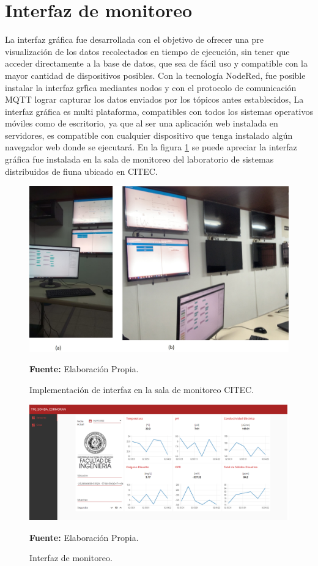 \section{Interfaz de monitoreo}
La interfaz gr\'afica fue desarrollada con el objetivo de ofrecer una pre visualizaci\'on de los datos recolectados en tiempo de ejecuci\'on, sin tener que acceder directamente a la base de datos, que sea de f\'acil uso y compatible con la mayor cantidad de dispositivos posibles.
Con la tecnolog\'ia NodeRed, fue posible instalar la interfaz gr\'fica mediantes nodos y con el protocolo de comunicaci\'on  MQTT lograr capturar los datos enviados por los t\'opicos antes  establecidos, 
La interfaz gr\'afica es multi plataforma, compatibles con todos los sistemas operativos m\'oviles como de escritorio, ya que al ser una aplicaci\'on web instalada en servidores, es compatible con cualquier dispositivo que tenga instalado alg\'un navegador web donde se ejecutará. 
En la figura \ref{fig:Monitoreo} se puede apreciar la interfaz gráfica fue instalada en la sala de monitoreo del laboratorio de sistemas distribuidos de fiuna ubicado en CITEC. 

\begin{figure}[H]
        \centering
        \includegraphics[scale=0.7]{Imagenes/cap4/SalaMonitoreo.jpg}
        \caption {Implementaci\'on de interfaz en la sala de monitoreo CITEC. }{\textbf{Fuente:}
        Elaboraci\'on Propia. }
        \label{fig:Monitoreo}
\end{figure}


\begin{figure}[H]
        \centering
        \includegraphics[scale=0.88]{Imagenes/cap4/nodeRed.png}
        \caption {Interfaz de monitoreo. }{\textbf{Fuente:}
        Elaboraci\'on Propia. }
        \label{fig:interfaz}
\end{figure}


